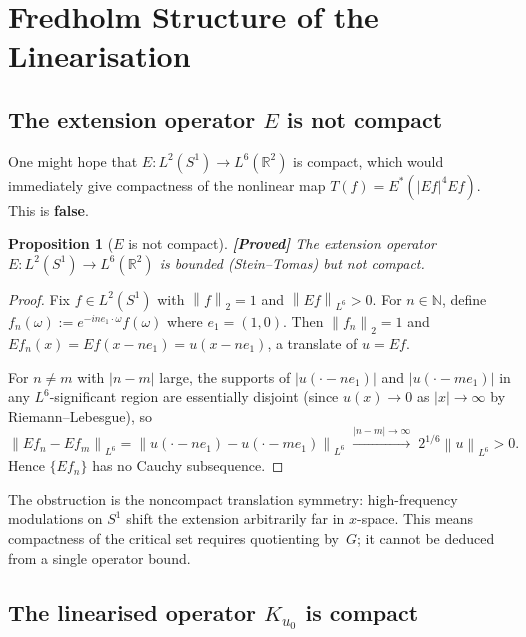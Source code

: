 \documentclass[12pt]{article}
\newtheorem{proposition}[theorem]{Proposition}
\theoremstyle{definition}
\theoremstyle{remark}
\newcommand{\R}{\mathbb{R}}
\newcommand{\N}{\mathbb{N}}
\newcommand{\norm}[1]{\left\|#1\right\|}
\newcommand{\proven}{\textbf{\color{teal}[Proved]}}
\begin{document}
\section{Fredholm Structure of the Linearisation}
\label{sec:fredholm}

\subsection{The extension operator $E$ is not compact}

One might hope that $E:L^2(S^1)\to L^6(\R^2)$ is compact, which would
immediately give compactness of the nonlinear map $T(f)=E^*(|Ef|^4Ef)$.
This is \textbf{false}.

\begin{proposition}[$E$ is not compact]
  \label{prop:E-not-compact}
  \proven\quad
  The extension operator $E:L^2(S^1)\to L^6(\R^2)$ is bounded
  (Stein--Tomas) but not compact.
\end{proposition}

\begin{proof}
  Fix $f\in L^2(S^1)$ with $\norm{f}_2=1$ and $\norm{Ef}_{L^6}>0$.
  For $n\in\N$, define $f_n(\omega):=e^{-ine_1\cdot\omega}f(\omega)$
  where $e_1=(1,0)$.  Then $\norm{f_n}_2=1$ and
  $Ef_n(x)=Ef(x-ne_1)=u(x-ne_1)$, a translate of $u=Ef$.

  For $n\neq m$ with $|n-m|$ large, the supports of $|u(\cdot-ne_1)|$ and
  $|u(\cdot-me_1)|$ in any $L^6$-significant region are essentially disjoint
  (since $u(x)\to 0$ as $|x|\to\infty$ by Riemann--Lebesgue), so
  \[
    \norm{Ef_n-Ef_m}_{L^6}
    = \norm{u(\cdot-ne_1)-u(\cdot-me_1)}_{L^6}
    \;\xrightarrow{|n-m|\to\infty}\;
    2^{1/6}\norm{u}_{L^6}>0.
  \]
  Hence $\{Ef_n\}$ has no Cauchy subsequence.
\end{proof}

The obstruction is the noncompact translation symmetry: high-frequency
modulations on $S^1$ shift the extension arbitrarily far in $x$-space.
This means compactness of the critical set requires quotienting by~$G$;
it cannot be deduced from a single operator bound.

\subsection{The linearised operator $K_{u_0}$ is compact}
\end{document}

